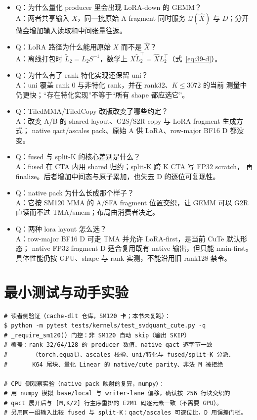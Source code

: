 \begin{itemize}[itemsep=1pt,topsep=2pt]
  \item Q：为什么量化 producer 里会出现 LoRA-down 的 GEMM？\\
        A：两者共享输入 $X$，同一批原始 A fragment 同时服务
        $\mathcal Q(\widehat X)$ 与 $D$；分开做会增加输入读取和中间张量往返。
  \item Q：LoRA 路径为什么能用原始 $X$ 而不是 $\widehat X$？\\
        A：离线打包时 $\widetilde L_2=L_2S^{-1}$，数学上
        $X\widetilde L_2^{\top}=\widehat XL_2^{\top}$（式~\ref{eq:39-d}）。
  \item Q：为什么有了 rank 特化实现还保留 uni？\\
        A：uni 覆盖 rank 0 与非特化 rank，并在 rank32、$K\le3072$ 的当前
        测量中仍更快；“存在特化实现”不等于“所有 shape 都应选它”。
  \item Q：TiledMMA/TiledCopy 改版改变了哪些约定？\\
        A：改变 A/B 的 shared layout、G2S/S2R copy 与 LoRA fragment 生成方式；
        native qact/ascales pack、原始 A 供 LoRA、row-major BF16 D 都没变。
  \item Q：fused 与 split-K 的核心差别是什么？\\
        A：fused 在 CTA 内用 shared 归约；split-K 跨 K CTA 写 FP32 scratch，
        再 finalize。后者增加中间态与原子累加，也失去 D 的逐位可复现性。
  \item Q：native pack 为什么长成那个样子？\\
        A：它按 SM120 MMA 的 A/SFA fragment 位置交织，让 GEMM 可以 G2R
        直读而不过 TMA/smem；布局由消费者决定。
  \item Q：两种 lora layout 怎么选？\\
        A：row-major BF16 D 可走 TMA 并允许 LoRA-first，是当前 CuTe 默认形态；
        native FP32 fragment D 适合复用既有 native 输出，但只能 main-first。
        具体性能仍按 GPU、shape 与 rank 实测，不能沿用旧 rank128 禁令。
\end{itemize}

\section{最小测试与动手实验}

\begin{lstlisting}[style=console]
# 读者侧验证（cache-dit 仓库，SM120 卡；本书未复跑）：
$ python -m pytest tests/kernels/test_svdquant_cute.py -q
# _require_sm120() 门控：非 SM120 自动 skip（输出 SKIP）
# 覆盖：rank 32/64/128 的 producer 数值、native qact 逐字节一致
#       （torch.equal）、ascales 校验、uni/特化与 fused/split-K 分派、
#       K64 尾块、量化 Linear 的 native/cute parity、非法 M 被拒绝

# CPU 侧观察实验（native pack 映射的复算，numpy）：
# 用 numpy 模拟 base/local 与 writer-lane 偏移，确认按 256 行块交织的
# qact 展开后与 [M,K/2] 行主序重排的 E2M1 码逐元素一致（不需要 GPU）。
# 另用同一组输入比较 fused 与 split-K：qact/ascales 可逐位比，D 用误差门槛。
\end{lstlisting}

